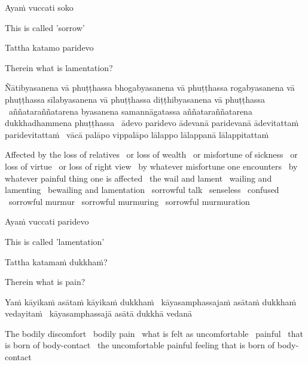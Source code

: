 Ayaṁ vuccati soko

\begin{cprenglish}
  This is called 'sorrow'
\end{cprenglish}

Tattha katamo paridevo

\begin{cprenglish}
  Therein what is lamentation?
\end{cprenglish}

Ñātibyasanena vā phuṭṭhassa bhogabyasanena vā phuṭṭhassa rogabyasanena vā phuṭṭhassa sīlabyasanena vā phuṭṭhassa diṭṭhibyasanena vā phuṭṭhassa \breathmark\ aññataraññatarena byasanena samannāgatassa aññataraññatarena dukkhadhammena phuṭṭhassa \breathmark\ ādevo paridevo ādevanā paridevanā ādevitattaṁ paridevitattaṁ \breathmark\ vācā palāpo vippalāpo lālappo lālappanā lālappitattaṁ

\begin{cprenglish}
  Affected by the loss of relatives \breathmark\ or loss of wealth \breathmark\ or misfortune of sickness \breathmark\ or loss of virtue \breathmark\ or loss of right view \breathmark\ by whatever misfortune one encounters \breathmark\ by whatever painful thing one is affected \breathmark\ the wail and lament \breathmark\ wailing and lamenting \breathmark\ bewailing and lamentation \breathmark\ sorrowful talk \breathmark\ senseless \breathmark\ confused \breathmark\ sorrowful murmur \breathmark\ sorrowful murmuring \breathmark\ sorrowful murmuration
\end{cprenglish}

Ayaṁ vuccati paridevo

\begin{cprenglish}
  This is called 'lamentation'
\end{cprenglish}

Tattha katamaṁ dukkhaṁ?

\begin{cprenglish}
  Therein what is pain?
\end{cprenglish}

Yaṁ kāyikaṁ asātaṁ kāyikaṁ dukkhaṁ \breathmark\ kāyasamphassajaṁ asātaṁ dukkhaṁ vedayitaṁ \breathmark\ kāyasamphassajā asātā dukkhā vedanā

\begin{cprenglish}
  The bodily discomfort \breathmark\ bodily pain \breathmark\ what is felt as uncomfortable \breathmark\ painful \breathmark\ that is born of body-contact \breathmark\ the uncomfortable painful feeling that is born of body-contact
\end{cprenglish}

